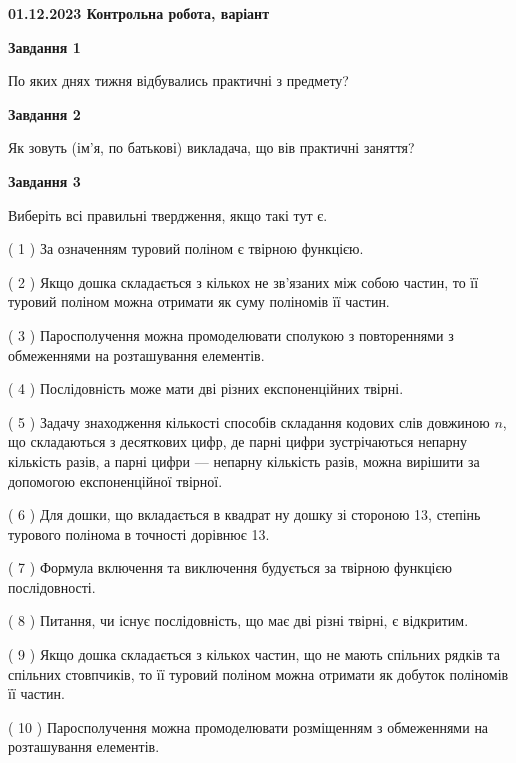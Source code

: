 \documentclass[12pt, ukrainian]{article}
\begin{document}
\begin {large}

\textbf{01.12.2023 Контрольна робота, варіант  }\par


{
{\begin {center}\textbf{Завдання 1}\end {center}}\par
По яких днях тижня відбувались практичні з предмету?\par
{\begin {center}\textbf{Завдання 2}\end {center}}\par
Як зовуть (ім'я, по батькові) викладача, що вів практичні заняття?\par
{\begin {center}\textbf{Завдання 3}\end {center}}\par
Виберіть всі правильні твердження, якщо такі тут є.\par
\vspace{2mm}
( 1 ) За означенням туровий поліном є твірною функцією.%

( 2 ) Якщо дошка складається з кількох не зв’язаних між собою частин, то її туровий поліном можна отримати як суму поліномів її частин.%

( 3 ) Паросполучення можна промоделювати сполукою з повтореннями з обмеженнями на розташування елементів.%

( 4 ) Послідовність може мати дві різних експоненційних твірні.%

( 5 ) Задачу знаходження кількості способів складання кодових слів довжиною $n$, що складаються з десяткових цифр, де парні цифри зустрічаються непарну кількість разів, а парні цифри — непарну кількість разів, можна вирішити за допомогою експоненційної твірної.%

( 6 ) Для дошки, що вкладається в квадрат ну дошку зі стороною 13, степінь турового полінома в точності дорівнює 13.%

( 7 ) Формула включення та виключення будується за твірною функцією послідовності.%

( 8 ) Питання, чи існує послідовність, що має дві різні твірні, є відкритим.%

( 9 ) Якщо дошка складається з кількох частин, що не мають спільних рядків та спільних стовпчиків, то її туровий поліном можна отримати як добуток поліномів її частин.%

( 10 ) Паросполучення можна промоделювати розміщенням з обмеженнями на розташування елементів.%
}
\end {large}

\vspace{4mm}
\newpage
\end{document}
